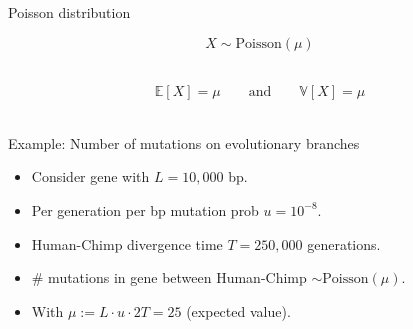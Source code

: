 \documentclass{beamer}
\newcommand{\E}{\mathbb{E}}
\newcommand{\V}{\mathbb{V}}
\newcommand{\1}{\ensuremath{\mathbf{1}}}
\begin{document}
%
%
%
\begin{frame}{Poisson distribution}
    \begin{block}{}
        \begin{equation}
            X \sim \text{Poisson}(\mu)
        \end{equation}
    \end{block}$~$\\[-5ex]
    \begin{equation}
        \E [X] = \mu \qquad \text{and} \qquad \V [X] = \mu
    \end{equation}$~$\\[-3ex]
    \begin{block}{Example: Number of mutations on evolutionary branches}
        \begin{itemize}
            \item Consider gene with $L = 10,000$ bp.
            \item Per generation per bp mutation prob $u = 10^{-8}$.
            \item Human-Chimp divergence time $T = 250,000$ generations.
            \item \# mutations in gene between Human-Chimp $\sim \text{Poisson}(\mu)$.
            \item With $\mu := L \cdot u \cdot 2T = 25$ (expected value).
        \end{itemize}
    \end{block}
\end{frame}
% 
%
%
\end{document}
